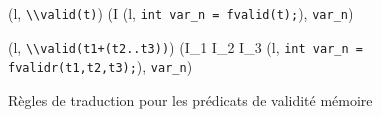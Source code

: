 \begin{figure*}[h!]
  \scriptsize{
    {\myinference[$\pi$-valid]
      {}
      {(l, \mbox{\lstinline'\\valid(t)'}) 
        (I \concat (l, \mbox{\lstinline'int var_n = fvalid(t);'}),
        \mbox{\lstinline'var_n'})
      }
    }

    {
      {
        (l, \mbox{\lstinline'\\valid(t1+(t2..t3))'}) 
        (I_1 \concat I_2 \concat I_3
        \concat (l, \mbox{\lstinline'int var_n = fvalidr(t1,t2,t3);'}),
        \mbox{\lstinline'var_n'})
      }
    }
  }
  \caption{Règles de traduction pour les prédicats de validité mémoire}
  \label{fig:valid}
\end{figure*}
